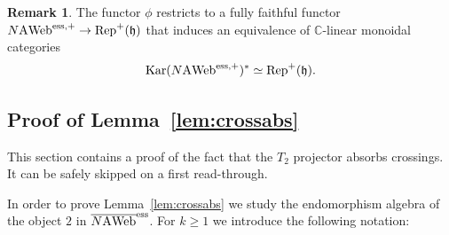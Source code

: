 \documentclass[11pt]{article}
\theoremstyle{definition}
\newtheorem{rema}[theo]{Remark}
\numberwithin{equation}{section}
\def\C{{\mathbb C}}
\newcommand{\rephp}{\Rep^{+}(\h)}
\def\h{{\mathfrak h}}
\newcommand{\Rep}{\cat{Rep}}
\newcommand{\cat}[1]{\ensuremath{\mbox{\bfseries {\upshape {#1}}}}}
\newcommand{\Kar}{\operatorname{Kar}}
\newcommand{\AWeb}[1][]{#1\cat{A}\cat{Web}}
\newcommand{\essAWebp}[1][]{#1\AWeb^{\mathrm{ess},+}}
\newcommand{\essbAWeb}[1][]{\overline{#1\AWeb}^{\mathrm{ess}}}
\begin{document}
\begin{rema} The functor $\phi$ restricts to a fully faithful functor $\essAWebp[N] \to \rephp$ that induces an equivalence of $\C$-linear monoidal categories \[\Kar(\essAWebp[N])^* \simeq \rephp.\]
\end{rema}

\subsection{Proof of Lemma~\ref{lem:crossabs}}
\label{sec:proofs}
This section contains a proof of the fact that the $T_2$ projector absorbs crossings. It can be safely skipped on a first read-through.

In order to prove Lemma~\ref{lem:crossabs} we study the endomorphism algebra of the object $2$ in $\essbAWeb[N]$. For $k\geq 1$ we introduce the following notation: 
\end{document}
